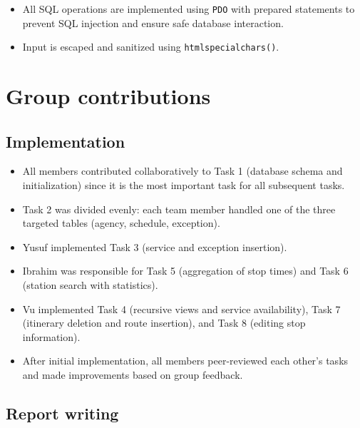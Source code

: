 \documentclass[a4paper, 12pt]{article}
\begin{document}
\begin{itemize}
    \item All SQL operations are implemented using \texttt{PDO} with prepared statements to prevent SQL injection and ensure safe database interaction.
    \item Input is escaped and sanitized using \texttt{htmlspecialchars()}.
\end{itemize}






\newpage
\section{Group contributions} \label{sec:4}

\subsection{Implementation}

\begin{itemize}
    \item All members contributed collaboratively to Task 1 (database schema and initialization) since it is the most important task for all subsequent tasks.
    \item Task 2 was divided evenly: each team member handled one of the three targeted tables (agency, schedule, exception).
    \item Yusuf implemented Task 3 (service and exception insertion).
    \item Ibrahim was responsible for Task 5 (aggregation of stop times) and Task 6 (station search with statistics).
    \item Vu implemented Task 4 (recursive views and service availability), Task 7 (itinerary deletion and route insertion), and Task 8 (editing stop information).
    \item After initial implementation, all members peer-reviewed each other’s tasks and made improvements based on group feedback.
\end{itemize}

\subsection{Report writing}
\end{document}
